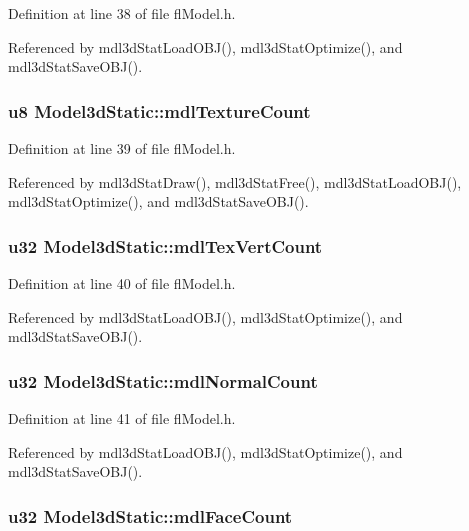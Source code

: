 Definition at line 38 of file fl\-Model.h.

Referenced by mdl3d\-Stat\-Load\-OBJ(), mdl3d\-Stat\-Optimize(), and mdl3d\-Stat\-Save\-OBJ().
\subsubsection{\setlength{\rightskip}{0pt plus 5cm}u8 {\bf Model3d\-Static::mdl\-Texture\-Count}}\label{structModel3dStatic_0cbf98a9bc8f0aaf5fca02509e9ebb8f}




Definition at line 39 of file fl\-Model.h.

Referenced by mdl3d\-Stat\-Draw(), mdl3d\-Stat\-Free(), mdl3d\-Stat\-Load\-OBJ(), mdl3d\-Stat\-Optimize(), and mdl3d\-Stat\-Save\-OBJ().
\subsubsection{\setlength{\rightskip}{0pt plus 5cm}u32 {\bf Model3d\-Static::mdl\-Tex\-Vert\-Count}}\label{structModel3dStatic_a8dc4bd70b6338ed95c6a4afa5a4b483}




Definition at line 40 of file fl\-Model.h.

Referenced by mdl3d\-Stat\-Load\-OBJ(), mdl3d\-Stat\-Optimize(), and mdl3d\-Stat\-Save\-OBJ().
\subsubsection{\setlength{\rightskip}{0pt plus 5cm}u32 {\bf Model3d\-Static::mdl\-Normal\-Count}}\label{structModel3dStatic_a2e22470c3f4b09e1a848a397435a997}




Definition at line 41 of file fl\-Model.h.

Referenced by mdl3d\-Stat\-Load\-OBJ(), mdl3d\-Stat\-Optimize(), and mdl3d\-Stat\-Save\-OBJ().
\subsubsection{\setlength{\rightskip}{0pt plus 5cm}u32 {\bf Model3d\-Static::mdl\-Face\-Count}}\label{structModel3dStatic_055f321b7c82bdb7ca29bacefbb2e241}




